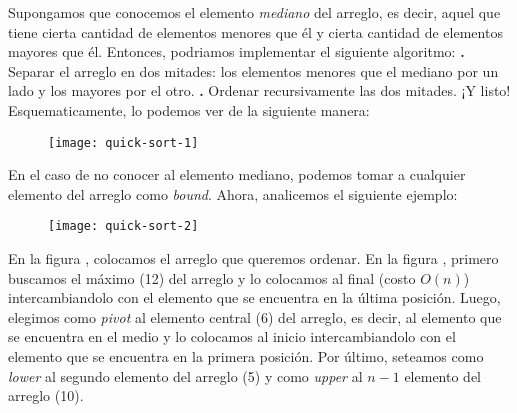 \documentclass[10pt,a4paper]{article}
\begin{document}
Supongamos que conocemos el elemento \textit{mediano} del arreglo, es decir, aquel que tiene cierta cantidad de elementos menores que él y cierta cantidad de elementos mayores que él. Entonces, podriamos implementar el siguiente algoritmo:
\newline
\newline
\textbf{.} Separar el arreglo en dos mitades: los elementos menores que el mediano por un lado y los mayores por el otro.
\newline
\newline
\textbf{.} Ordenar recursivamente las dos mitades.
\newline
\newline
¡Y listo!
\newline
\newline
Esquematicamente, lo podemos ver de la siguiente manera:
\newline
\newline
\begin{figure}[h]
	\centering
\texttt{[image: quick-sort-1]}
	\label{drivers1}
\end{figure}
\newline
\newline
\newline
En el caso de no conocer al elemento mediano, podemos tomar a cualquier elemento del arreglo como \textit{bound}.
\newline
\newline
Ahora, analicemos el siguiente ejemplo:
\newline
\newline
\begin{figure}[h]
	\centering
\texttt{[image: quick-sort-2]}
	\label{drivers1}
\end{figure}
\newline
\newline
\newline
En la figura , colocamos el arreglo que queremos ordenar.
\newline
\newline
En la figura , primero buscamos el máximo (12) del arreglo y lo colocamos al final (costo $O(n)$) intercambiandolo con el elemento que se encuentra en la última posición. Luego, elegimos como \textit{pivot} al elemento central (6) del arreglo, es decir, al elemento que se encuentra en el medio y lo colocamos al inicio intercambiandolo con el elemento que se encuentra en la primera posición. Por último, seteamos como \textit{lower} al segundo elemento del arreglo (5) y como \textit{upper} al $n-1$ elemento del arreglo (10). 
\end{document}
